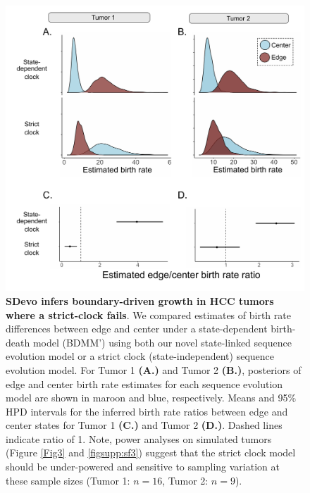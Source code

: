 \documentclass[12pt]{elife_based}
\begin{document}
\begin{figure}
\includegraphics[width=\textwidth]{figures/figure_5_supp_wgs_strict_clock_comparison.pdf}
\caption{\textbf{SDevo infers boundary-driven growth in HCC tumors where a strict-clock fails}. We compared estimates of birth rate differences between edge and center under a state-dependent birth-death model (BDMM') using both our novel state-linked sequence evolution model or a strict clock (state-independent) sequence evolution model. For Tumor 1 \textbf{(A.)} and Tumor 2 \textbf{(B.)}, posteriors of edge and center birth rate estimates for each sequence evolution model are shown in maroon and blue, respectively. Means and 95\% HPD intervals for the inferred birth rate ratios between edge and center states for Tumor 1 \textbf{(C.)} and Tumor 2 \textbf{(D.)}. Dashed lines indicate ratio of 1. Note, power analyses on simulated tumors (Figure \ref{Fig3} and \ref{figsupp:sf3}) suggest that the strict clock model should be under-powered and sensitive to sampling variation at these sample sizes (Tumor 1: $n = 16$, Tumor 2: $n = 9$).} 
\label{figsupp:sf5-3}
\end{figure} 
\end{document}
